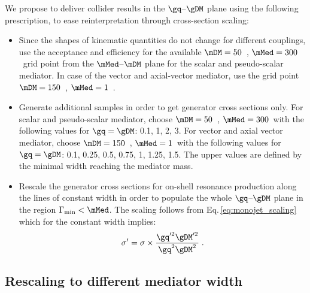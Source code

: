 We propose to deliver collider results in the $\gq$--$\gDM$ plane using the following prescription, to ease reinterpretation through cross-section scaling:
\begin{itemize}
	\item Since the shapes of kinematic quantities do not change for different couplings, use the acceptance and efficiency for the available $\mDM=50$~\gev, $\mMed=300$~\gev grid point from the $\mMed$--$\mDM$ plane for the scalar and pseudo-scalar mediator. In case of the vector and axial-vector mediator, use the grid point $\mDM=150$~\gev, $\mMed=1$~\tev.
	\item Generate additional samples in order to get generator cross sections only. For scalar and pseudo-scalar mediator, choose $\mDM=50$~\gev, $\mMed=300$~\gev with the following values for $\gq=\gDM$: 0.1, 1, 2, 3. For vector and axial vector mediator, choose $\mDM=150$~\gev, $\mMed=1$~\tev with the following values for $\gq=\gDM$: 0.1, 0.25, 0.5, 0.75, 1, 1.25, 1.5. The upper values are defined by the minimal width reaching the mediator mass. 
	\item Rescale the generator cross sections for on-shell resonance production along the lines of constant width in order to populate the whole $\gq$--$\gDM$ plane in the region $\Gamma_{\rm{min}}<\mMed$.
The scaling follows from Eq.\,\ref{eq:monojet_scaling} which for the constant width implies:
\begin{equation}
\sigma' = \sigma \times \frac{\gq'^2\gDM'^2}{\gq^2\gDM^2} \;.
\end{equation}
\end{itemize}



\subsection{Rescaling to different mediator width}
\label{paragraph:nonminimalwidth}

